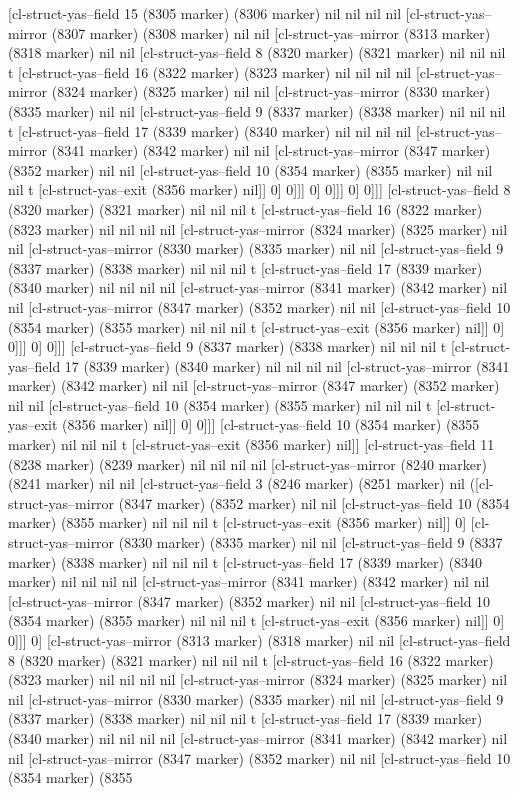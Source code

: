 {{[cl-struct-yas--field 15 (8305 marker) (8306 marker) nil nil nil nil [cl-struct-yas--mirror (8307 marker) (8308 marker) nil nil [cl-struct-yas--mirror (8313 marker) (8318 marker) nil nil [cl-struct-yas--field 8 (8320 marker) (8321 marker) nil nil nil t [cl-struct-yas--field 16 (8322 marker) (8323 marker) nil nil nil nil [cl-struct-yas--mirror (8324 marker) (8325 marker) nil nil [cl-struct-yas--mirror (8330 marker) (8335 marker) nil nil [cl-struct-yas--field 9 (8337 marker) (8338 marker) nil nil nil t [cl-struct-yas--field 17 (8339 marker) (8340 marker) nil nil nil nil [cl-struct-yas--mirror (8341 marker) (8342 marker) nil nil [cl-struct-yas--mirror (8347 marker) (8352 marker) nil nil [cl-struct-yas--field 10 (8354 marker) (8355 marker) nil nil nil t [cl-struct-yas--exit (8356 marker) nil]] 0] 0]]] 0] 0]]] 0] 0]]] [cl-struct-yas--field 8 (8320 marker) (8321 marker) nil nil nil t [cl-struct-yas--field 16 (8322 marker) (8323 marker) nil nil nil nil [cl-struct-yas--mirror (8324 marker) (8325 marker) nil nil [cl-struct-yas--mirror (8330 marker) (8335 marker) nil nil [cl-struct-yas--field 9 (8337 marker) (8338 marker) nil nil nil t [cl-struct-yas--field 17 (8339 marker) (8340 marker) nil nil nil nil [cl-struct-yas--mirror (8341 marker) (8342 marker) nil nil [cl-struct-yas--mirror (8347 marker) (8352 marker) nil nil [cl-struct-yas--field 10 (8354 marker) (8355 marker) nil nil nil t [cl-struct-yas--exit (8356 marker) nil]] 0] 0]]] 0] 0]]] [cl-struct-yas--field 9 (8337 marker) (8338 marker) nil nil nil t [cl-struct-yas--field 17 (8339 marker) (8340 marker) nil nil nil nil [cl-struct-yas--mirror (8341 marker) (8342 marker) nil nil [cl-struct-yas--mirror (8347 marker) (8352 marker) nil nil [cl-struct-yas--field 10 (8354 marker) (8355 marker) nil nil nil t [cl-struct-yas--exit (8356 marker) nil]] 0] 0]]] [cl-struct-yas--field 10 (8354 marker) (8355 marker) nil nil nil t [cl-struct-yas--exit (8356 marker) nil]] [cl-struct-yas--field 11 (8238 marker) (8239 marker) nil nil nil nil [cl-struct-yas--mirror (8240 marker) (8241 marker) nil nil [cl-struct-yas--field 3 (8246 marker) (8251 marker) nil ([cl-struct-yas--mirror (8347 marker) (8352 marker) nil nil [cl-struct-yas--field 10 (8354 marker) (8355 marker) nil nil nil t [cl-struct-yas--exit (8356 marker) nil]] 0] [cl-struct-yas--mirror (8330 marker) (8335 marker) nil nil [cl-struct-yas--field 9 (8337 marker) (8338 marker) nil nil nil t [cl-struct-yas--field 17 (8339 marker) (8340 marker) nil nil nil nil [cl-struct-yas--mirror (8341 marker) (8342 marker) nil nil [cl-struct-yas--mirror (8347 marker) (8352 marker) nil nil [cl-struct-yas--field 10 (8354 marker) (8355 marker) nil nil nil t [cl-struct-yas--exit (8356 marker) nil]] 0] 0]]] 0] [cl-struct-yas--mirror (8313 marker) (8318 marker) nil nil [cl-struct-yas--field 8 (8320 marker) (8321 marker) nil nil nil t [cl-struct-yas--field 16 (8322 marker) (8323 marker) nil nil nil nil [cl-struct-yas--mirror (8324 marker) (8325 marker) nil nil [cl-struct-yas--mirror (8330 marker) (8335 marker) nil nil [cl-struct-yas--field 9 (8337 marker) (8338 marker) nil nil nil t [cl-struct-yas--field 17 (8339 marker) (8340 marker) nil nil nil nil [cl-struct-yas--mirror (8341 marker) (8342 marker) nil nil [cl-struct-yas--mirror (8347 marker) (8352 marker) nil nil [cl-struct-yas--field 10 (8354 marker) (8355 }}
